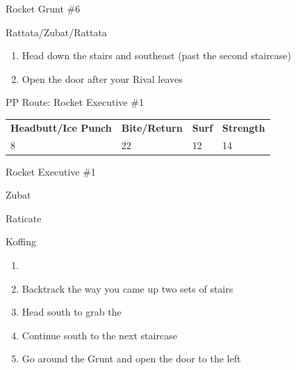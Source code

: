 \begin{paracol}{2}
\switchcolumn
\begin{trainer}{Rocket Grunt \#6}
	\varwb
	\begin{fightSection}{Rattata/Zubat/Rattata}
		\item {} \bite{} 
	\end{fightSection}
	\varwe
\end{trainer}

\begin{enumerate}[resume]
	\item Head down the stairs and southeast (past the second staircase)
	\item Open the door after your Rival leaves
\end{enumerate}

\switchcolumn*
\begin{misc}{PP Route: Rocket Executive \#1}
	\varwb
	\begin{tabu} to \textwidth {X[6,c] X[5,c] X[4,c] X[4,c]}
		\textbf{Headbutt/Ice Punch} & \textbf{Bite/Return} & \textbf{Surf} & \textbf{Strength}\\ 
		8 & 22 & 12 & 14
	\end{tabu}
	\varwe
\end{misc}

\switchcolumn
\begin{trainer}{Rocket Executive \#1}
	\varwb
	\begin{fightSection}{Zubat}
		\item {} \headbutt
	\end{fightSection}
	\begin{fightSection}{Raticate}
		\item {} \strength
	\end{fightSection}
	\begin{fightSection}{Koffing}
		\item {} \surf
	\end{fightSection}
	\varwe
\end{trainer}

\begin{enumerate}[resume]
	\item {}
	\item Backtrack the way you came up two sets of stairs
	\item Head south to grab the 
	\item Continue south to the next staircase
	\item Go around the Grunt and open the door to the left
\end{enumerate}


\end{paracol}
